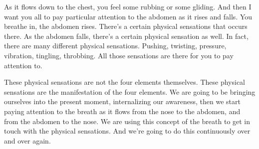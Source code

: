 \documentclass[letterpaper,10pt,english]{sphinxmanual}
\begin{document}
\sphinxAtStartPar
As  it  flows  down  to  the  chest,  you  feel  some  rubbing  or  some  gliding. And then I want you all to pay particular attention to the abdomen as it
rises and falls. You breathe in, the abdomen rises. There’s a certain physical
sensations that occurs there. As the abdomen falls, there’s a certain physical
sensation as well. In fact, there are many different physical sensations. Pushing,  twisting,  pressure,  vibration,  tingling,  throbbing. All  those  sensations
are there for you to pay attention to.

\sphinxAtStartPar
These physical sensations are not the four elements themselves. These
physical sensations are the manifestation of the four elements. We are going
to be bringing ourselves into the present moment, internalizing our awareness, then we start paying attention to the breath as it flows from the nose to
the abdomen, and from the abdomen to the nose. We are using this concept
of the breath to get in touch with the physical sensations. And we’re going to
do this continuously over and over again.
\end{document}
